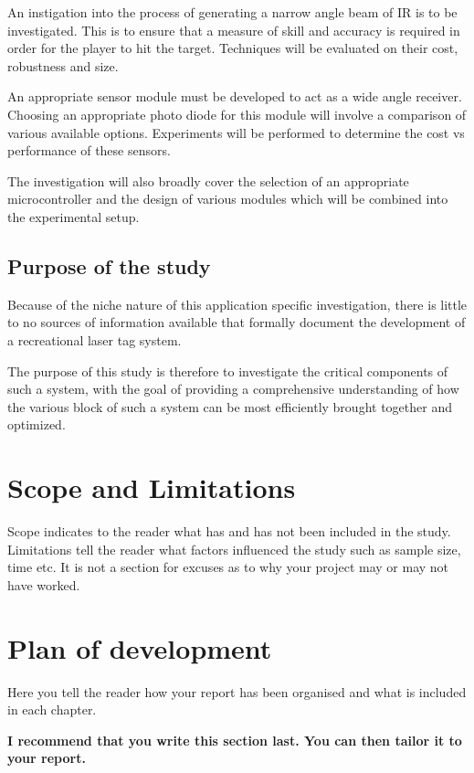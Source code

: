 An instigation into the process of generating a narrow angle beam of IR is to be investigated. This is to ensure that a measure of skill and accuracy is required in order for the player to hit the target. Techniques will be evaluated on their cost, robustness and size.

An appropriate sensor module must be developed to act as a wide angle receiver. Choosing an appropriate photo diode for this module will involve a comparison of various available options. Experiments will be performed to determine the cost vs performance of these sensors.

The investigation will also broadly cover the selection of an appropriate microcontroller and the design of various modules which will be combined into the experimental setup.

\subsection{Purpose of the study}
Because of the niche nature of this application specific investigation, there is little to no sources of information available that formally document the development of a recreational laser tag system.

The purpose of this study is therefore to investigate the critical components of such a system, with the goal of providing a comprehensive understanding of how the various block of such a system can be most efficiently brought together and optimized. 

\section{Scope and Limitations}
Scope indicates to the reader what has and has not been included in the study. Limitations tell the
reader what factors influenced the study such as sample size, time etc. It is not a section for excuses as
to why your project may or may not have worked.

\section{Plan of development}
Here you tell the reader how your report has been organised and what is included in each
chapter.

{\bf I recommend that you write this section last. You can then tailor it to your report.}
